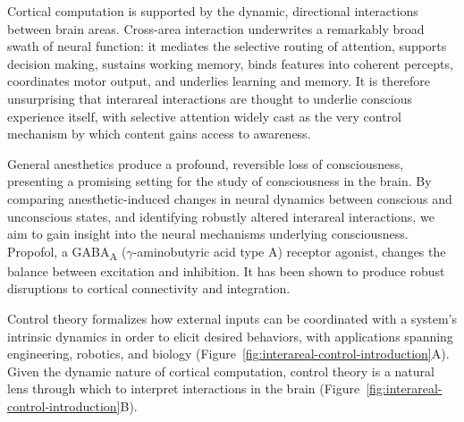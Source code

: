 Cortical computation is supported by the dynamic, directional interactions between brain areas. Cross-area interaction underwrites a remarkably broad swath of neural function:\cite{Ward2003-ez, Siegel2012-sj} it mediates the selective routing of attention,\cite{Palva2007-ug, Buschman2007-nk, Gregoriou2009-sb, Gregoriou2012-oo, Salinas2001-qs, Fries2001-gu, Siegel2008-iq, Van_Kempen2021-mh, Gray1989-rv} supports decision making,\cite{Siegel2011-hb, Siegel2015-wt} sustains working memory,\cite{Brincat2021-mg, Salazar2012-rg} binds features into coherent percepts,\cite{Engel2001-eh, Singer1995-lv} coordinates motor output,\cite{Murthy1996-gj, Logiaco2021-py, Arce-McShane2016-bn, Perich2018-pm, Kaufman2014-uo} and underlies learning and memory.\cite{Brincat2015-od, Jones2005-zw, Siapas1998-el, Fernandez-Ruiz2021-ob, Antzoulatos2014-jh} It is therefore unsurprising that interareal interactions are thought to underlie conscious experience itself,\cite{Crick1990-st, Engel2016-wn, Thompson2001-js, Mashour2020-vh, Aru2020-kn} with selective attention widely cast as the very control mechanism by which content gains access to awareness.\cite{Block1995-cw, Graziano2020-wp, Taylor2006-de}

General anesthetics produce a profound, reversible loss of consciousness, presenting a promising setting for the study of consciousness in the brain.\cite{Bonhomme2019-qs,Alkire2008-zy,Brown2011-xy,Luppi2024-vb,Mashour2024-jb,Ding2025-zm} By comparing anesthetic-induced changes in neural dynamics between conscious and unconscious states, and identifying robustly altered interareal interactions, we aim to gain insight into the neural mechanisms underlying consciousness. Propofol, a GABA\textsubscript{A} ($\gamma$-aminobutyric acid type A) receptor agonist, changes the balance between excitation and inhibition.\cite{Brown2010-hj,Ching2010-wd,Boly2012-co,Lewis2012-bs,Monti2013-vy,Bastos2021-tu,Hemmings2005-zo} It has been shown to produce robust disruptions to cortical connectivity and integration.\cite{Lewis2012-bs, Bardon2025-zi, Li2026-nh, Huang2024-px, Liang2025-li, Wilsenach2025-zy, Castro2024-dr, Luppi2025-oa, Luppi2024-yl, Alkire2008-zy, Boveroux2010-pn, Demertzi2019-gz, Song2015-lm, Lee2018-su, Malekmohammadi2018-oa, Ensel2024-cg, Tauber2023-sp, Franks2008-ej}

Control theory formalizes how external inputs can be coordinated with a system's intrinsic dynamics in order to elicit desired behaviors, with applications spanning engineering, robotics, and biology (Figure~\ref{fig:interareal-control-introduction}A). Given the dynamic nature of cortical computation, control theory is a natural lens through which to interpret interactions in the brain (Figure~\ref{fig:interareal-control-introduction}B).\cite{Gu2015-ej, Kao2019-ry, Bassett2017-ap, Kao2021-no, Logiaco2021-py, Kozachkov2022-po, Schimel2021-ro, Muldoon2016-bz}

